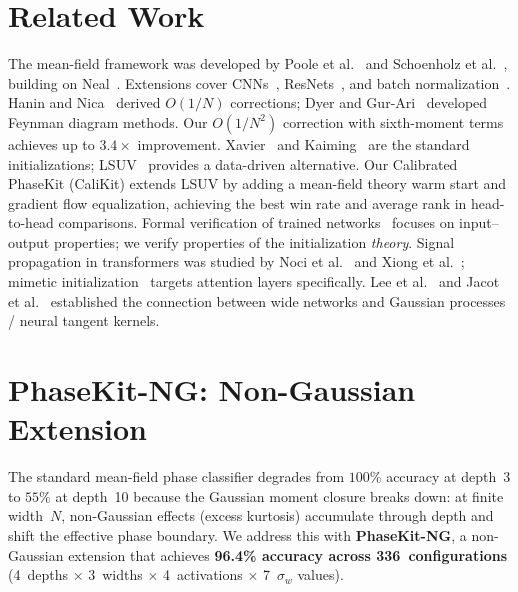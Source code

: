 \documentclass[10pt]{article}
\begin{document}
\section{Related Work}
\label{sec:related}

The mean-field framework was developed by Poole et al.~\cite{poole2016exponential} and Schoenholz et al.~\cite{schoenholz2017deep}, building on Neal~\cite{neal1996bayesian}.
Extensions cover CNNs~\cite{xiao2018dynamical}, ResNets~\cite{yang2017mean}, and batch normalization~\cite{yang2019mean}.
Hanin and Nica~\cite{hanin2018neural,hanin2020finite} derived $O(1/N)$ corrections; Dyer and Gur-Ari~\cite{dyer2020asymptotics} developed Feynman diagram methods.
Our $O(1/N^2)$ correction with sixth-moment terms achieves up to $3.4\times$ improvement.
Xavier~\cite{glorot2010understanding} and Kaiming~\cite{he2015delving} are the standard initializations; LSUV~\cite{mishkin2016all} provides a data-driven alternative.
Our Calibrated PhaseKit (CaliKit) extends LSUV by adding a mean-field theory warm start and gradient flow equalization, achieving the best win rate and average rank in head-to-head comparisons.
Formal verification of trained networks~\cite{katz2017reluplex,huang2017safety,singh2019abstract} focuses on input--output properties; we verify properties of the initialization \emph{theory}.
Signal propagation in transformers was studied by Noci et al.~\cite{noci2022signal} and Xiong et al.~\cite{he2020layer}; mimetic initialization~\cite{trockman2023mimetic} targets attention layers specifically.
Lee et al.~\cite{lee2018deep} and Jacot et al.~\cite{jacot2018neural} established the connection between wide networks and Gaussian processes / neural tangent kernels.

\section{PhaseKit-NG: Non-Gaussian Extension}
\label{sec:phasekit-ng}

The standard mean-field phase classifier degrades from $100\%$ accuracy at depth~3 to $55\%$ at depth~10 because the Gaussian moment closure breaks down: at finite width~$N$, non-Gaussian effects (excess kurtosis) accumulate through depth and shift the effective phase boundary.
We address this with \textbf{PhaseKit-NG}, a non-Gaussian extension that achieves \textbf{96.4\% accuracy across 336~configurations} (4~depths $\times$ 3~widths $\times$ 4~activations $\times$ 7~$\sigma_w$ values).
\end{document}
